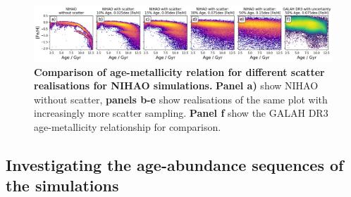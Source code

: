 \documentclass[fleqn,usenatbib]{mnras}
\begin{document}
\begin{figure}
	\includegraphics[width=\textwidth]{figures/nihao_with_scatter.png}
    \caption{
    \textbf{Comparison of age-metallicity relation for different scatter realisations for NIHAO simulations.}
    \textbf{Panel a)} show NIHAO without scatter, \textbf{panels b-e} show realisations of the same plot with increasingly more scatter sampling. \textbf{Panel f} show the GALAH DR3 age-metallicity relationship for comparison.
    }
    \label{fig:nihao_with_scatter}
\end{figure}


\subsection{Investigating the age-abundance sequences of the simulations}\label{sec:uncertainties}
\end{document}
